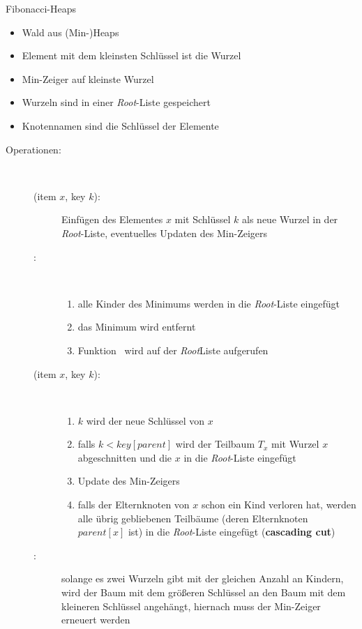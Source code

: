 \begin{TOP}{Fibonacci-Heaps}
\up\up\begin{itemize}
	\item Wald aus (Min-)Heaps
	\item Element mit dem kleinsten Schlüssel ist die Wurzel
	\item Min-Zeiger auf kleinste Wurzel
	\item Wurzeln sind in einer \textit{Root}-Liste gespeichert
	\item Knotennamen sind die Schlüssel der Elemente
\end{itemize}

\begin{description}
	\item[Operationen:]\ \\\up
	\begin{description}
		\item[\insert(item $x$, key $k$):] Einfügen des Elementes $x$ mit Schlüssel $k$ als neue Wurzel in der \textit{Root}-Liste, eventuelles Updaten des Min-Zeigers
		\item[\exMin:]\ \\\up
			\begin{enumerate}
				\item alle Kinder des Minimums werden in die \textit{Root}-Liste eingefügt
				\item das Minimum wird entfernt
				\item Funktion \cons~wird auf der \textit{Root}Liste aufgerufen
			\end{enumerate}
		\item[\decKey(item $x$, key $k$):] \ \\\up
			\begin{enumerate}
				\item $k$ wird der neue Schlüssel von $x$
				\item falls $k<key[parent]$ wird der Teilbaum $T_x$ mit Wurzel $x$ abgeschnitten und die $x$ in die \textit{Root}-Liste eingefügt
				\item Update des Min-Zeigers
				\item falls der Elternknoten von $x$ schon ein Kind verloren hat, werden alle übrig gebliebenen Teilbäume (deren Elternknoten $parent[x]$ ist) in die \textit{Root}-Liste eingefügt (\textbf{cascading cut})
			\end{enumerate}
		\item[\cons:] solange es zwei Wurzeln gibt mit der gleichen Anzahl an Kindern, wird der Baum mit dem größeren Schlüssel an den Baum mit dem kleineren Schlüssel angehängt, hiernach muss der Min-Zeiger erneuert werden
	\end{description}
\end{description}
\end{TOP}